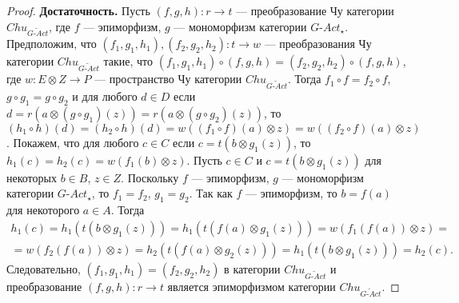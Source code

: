 \documentclass[a4paper,12pt]{article}
\newcommand{\GAct}{G\text{-}Act}
\begin{document}
\begin{proof}
    \textbf{Достаточность.} Пусть $(f,g,h): r \to t$ --- преобразование Чу категории $Chu_{\widetilde{\GAct}}$, где $f$ --- эпиморфизм, $g$ --- мономорфизм категории $\GAct_{\star}$. Предположим, что $(f_1,g_1,h_1), (f_2,g_2,h_2): t \to w$ --- преобразования Чу категории $Chu_{\widetilde{\GAct}}$ такие, что $(f_1,g_1,h_1) \circ (f,g,h) = (f_2,g_2,h_2) \circ (f,g,h)$, где $w: E \otimes Z \to P$ --- пространство Чу категории $Chu_{\widetilde{\GAct}}$. Тогда $f_1 \circ f = f_2 \circ f$, $g \circ g_1 = g \circ g_2$ и для любого $d \in D$ если $d = r(a \otimes (g \circ g_1)(z)) = r(a \otimes (g \circ g_2)(z))$, то $(h_1 \circ h)(d) = (h_2 \circ h)(d) = w((f_1 \circ f)(a) \otimes z) = w((f_2 \circ f)(a) \otimes z)$. Покажем, что для любого $c \in C$ если $c = t(b \otimes g_1(z))$, то $h_1(c) = h_2(c) = w(f_1(b) \otimes z)$. Пусть $c \in C$ и $c = t(b \otimes g_1(z))$ для некоторых $b \in B$, $z \in Z$. Поскольку $f$ --- эпиморфизм, $g$ --- мономорфизм категории $\GAct_{\star}$, то $f_1 = f_2$, $g_1 = g_2$. Так как $f$ --- эпиморфизм, то $b = f(a)$ для некоторого $a \in A$. Тогда 
    \begin{multline*}
        h_1(c) = h_1(t(b \otimes g_1(z))) = h_1(t(f(a) \otimes g_1(z))) = w(f_1(f(a)) \otimes z) =\\=
        w(f_2(f(a)) \otimes z) = h_2(t(f(a) \otimes g_2(z))) = h_1(t(b \otimes g_1(z))) = h_2(c).
    \end{multline*}
    Следовательно, $(f_1,g_1,h_1) = (f_2,g_2,h_2)$ в категории $Chu_{\widetilde{\GAct}}$ и преобразование $(f,g,h): r \to t$ является эпиморфизмом категории $Chu_{\widetilde{\GAct}}$.
\end{proof}
\end{document}
